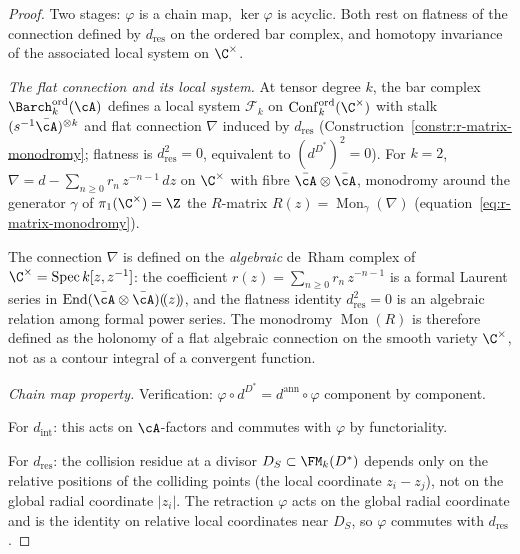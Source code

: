 \begin{proof}
Two stages: $\varphi$ is a chain map, $\ker\varphi$ is acyclic. Both rest on flatness of the connection defined by $d_{\mathrm{res}}$ on the
ordered bar complex, and homotopy
invariance of the associated local system on
$\C^\times$.

\emph{The flat connection and its local system.}
At tensor degree $k$, the bar complex
${\Barch}_k^{\mathrm{ord}}(\cA)$ defines a local
system $\mathcal{F}_k$ on
$\mathrm{Conf}_k^{\mathrm{ord}}(\C^\times)$ with
stalk $(s^{-1}\bar\cA)^{\otimes k}$ and flat
connection $\nabla$ induced by $d_{\mathrm{res}}$
(Construction~\ref{constr:r-matrix-monodromy};
flatness is $d_{\mathrm{res}}^2=0$, equivalent to $(d^{D^*})^2=0$). For $k=2$,
$\nabla=d-\sum_{n\ge 0}r_n\,z^{-n-1}\,dz$ on
$\C^\times$ with fibre $\bar\cA\otimes\bar\cA$,
monodromy around the generator $\gamma$ of
$\pi_1(\C^\times)=\Z$ the $R$-matrix
$R(z)=\operatorname{Mon}_\gamma(\nabla)$
(equation~\eqref{eq:r-matrix-monodromy}).

The connection $\nabla$ is defined on the
\emph{algebraic} de~Rham complex of
$\C^\times=\operatorname{Spec}k[z,z^{-1}]$: the
coefficient $r(z)=\sum_{n\ge 0}r_n\,z^{-n-1}$
is a formal Laurent series in
$\operatorname{End}(\bar\cA\otimes\bar\cA)(\!(z)\!)$,
and the flatness identity $d_{\mathrm{res}}^2=0$ is an
algebraic relation among formal power series.
The monodromy $\operatorname{Mon}(R)$ is therefore
defined as the holonomy of a flat algebraic
connection on the smooth variety $\C^\times$, not as a
contour integral of a convergent function.

\emph{Chain map property.}
Verification: $\varphi\circ d^{D^*} = d^{\mathrm{ann}}\circ\varphi$
component by component.

For $d_{\mathrm{int}}$: this acts on $\cA$-factors and commutes
with $\varphi$ by functoriality.

For $d_{\mathrm{res}}$: the collision residue at a divisor
$D_S\subset\FM_k(D^*)$ depends only on the relative positions
of the colliding points (the local coordinate
$z_i - z_j$), not on the global radial coordinate $|z_i|$.
The retraction $\varphi$ acts on the global radial coordinate
and is the identity on relative local coordinates near $D_S$,
so $\varphi$ commutes with $d_{\mathrm{res}}$.


\end{proof}
